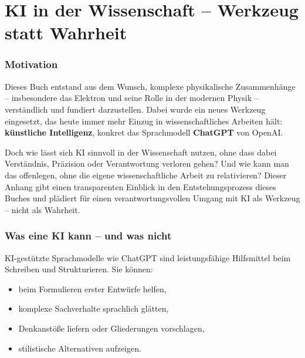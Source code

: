 \cleardoublepage



\chapter{KI in der Wissenschaft – Werkzeug statt Wahrheit}


\label{anhangC:ki}


\subsection*{Motivation}
Dieses Buch entstand aus dem Wunsch, komplexe physikalische Zusammenhänge – insbesondere das Elektron und seine Rolle in der modernen Physik – verständlich und fundiert darzustellen. Dabei wurde ein neues Werkzeug eingesetzt, das heute immer mehr Einzug in wissenschaftliches Arbeiten hält: \textbf{künstliche Intelligenz}, konkret das Sprachmodell \textbf{ChatGPT} von OpenAI.

Doch wie lässt sich KI sinnvoll in der Wissenschaft nutzen, ohne dass dabei Verständnis, Präzision oder Verantwortung verloren gehen? Und wie kann man das offenlegen, ohne die eigene wissenschaftliche Arbeit zu relativieren? Dieser Anhang gibt einen transparenten Einblick in den Entstehungsprozess dieses Buches und plädiert für einen verantwortungsvollen Umgang mit KI als Werkzeug – nicht als Wahrheit.

\subsection*{Was eine KI kann – und was nicht}
KI-gestützte Sprachmodelle wie ChatGPT sind leistungsfähige Hilfsmittel beim Schreiben und Strukturieren. Sie können:
\begin{itemize}
	\item beim Formulieren erster Entwürfe helfen,
	\item komplexe Sachverhalte sprachlich glätten,
	\item Denkanstöße liefern oder Gliederungen vorschlagen,
	\item stilistische Alternativen aufzeigen.
\end{itemize}

